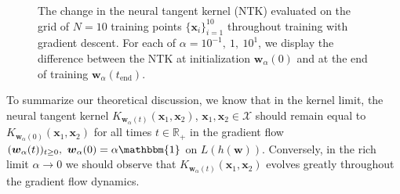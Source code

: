 \documentclass{article}
\begin{document}
\begin{figure}[H]
\centering
{}\hfill
{}\par 
{}
\caption{The change in the neural tangent kernel (NTK) evaluated on the grid of $N= 10$ training points $\{ \boldsymbol{x}_i \}_{i=1}^{10}$ throughout training with gradient descent. For each of $\alpha = 10^{-1}, \ 1, \ 10^{1}$, we display the difference between the NTK at initialization $\boldsymbol{w}_{\alpha}(0)$ and at the end of training $\boldsymbol{w}_{\alpha}(t_{\text{end}})$.}\label{img:ntkchange}
\end{figure}

To summarize our theoretical discussion, we know that in the kernel limit, the neural tangent kernel $K_{\boldsymbol{w}_{\alpha}(t)}(\boldsymbol{x}_1, \boldsymbol{x}_2)$, $\boldsymbol{x}_1, \boldsymbol{x}_2 \in \mathcal{X}$ should remain equal to $K_{\boldsymbol{w}_{\alpha}(0)}(\boldsymbol{x}_1, \boldsymbol{x}_2)$ for all times $t \in \mathbb{R}_+$ in the gradient flow $(\boldsymbol{w}_{\alpha}(t))_{t \geq 0}, \ \boldsymbol{w}_{\alpha}(0) = \alpha \mathbbm{1}$ on $L(h(\boldsymbol{w}))$. Conversely, in the rich limit $\alpha \rightarrow 0$ we should observe that $K_{\boldsymbol{w}_{\alpha}(t)}(\boldsymbol{x}_1, \boldsymbol{x}_2)$ evolves greatly throughout the gradient flow dynamics.
\end{document}
